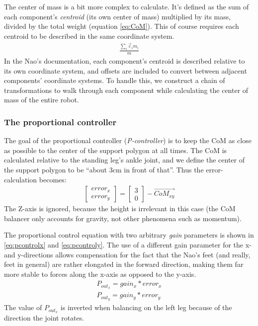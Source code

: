 \documentclass[a4paper]{article}
\begin{document}
The center of mass is a bit more complex to calculate. It's defined as the sum
of each component’s \emph{centroid} (its own center of mass) multiplied by its
mass, divided by the total weight (equation \ref{eq:CoM}). This of course
requires each centroid to be described in the same coordinate system.
\begin{align}
  \frac{\sum_i \vec{c}_i m_i} {m}        \label{eq:CoM}
\end{align}
In the Nao’s documentation, each component's centroid is described relative to
its own coordinate system, and offsets are included to convert between adjacent
components’ coordinate systems. To handle this, we construct a chain of
transformations to walk through each component while calculating the center of
mass of the entire robot.

\subsubsection{The proportional controller}
The goal of the proportional controller (\emph{P-controller}) is to keep the
CoM as close as possible to the center of the support polygon at all times.
The CoM is calculated relative to the standing leg's ankle joint, and we define
the center of the support polygon to be ``about 3cm in front of that''. Thus the
error-calculation becomes:
\begin{align}
  \begin{bmatrix} error_x \\ error_y \end{bmatrix} = \begin{bmatrix} 3 \\ 0 \end{bmatrix} - \vec{CoM_{xy}} 
\end{align}
The Z-axis is ignored, because the height is irrelevant in this case (the CoM
balancer only accounts for gravity, not other phenomena such as momentum).

The proportional control equation with two arbitrary \emph{gain} parameters is
shown in \ref{eq:pcontrolx} and \ref{eq:pcontroly}. The use of a different gain
parameter for the x- and y-directions allows compensation for the fact that the
Nao's feet (and really, feet in general) are rather elongated in the forward
direction, making them far more stable to forces along the x-axis as opposed to
the y-axis.
\begin{align}
  P_{out_{x}} = gain_x * error_x        \label{eq:pcontrolx} \\
  P_{out_{y}} = gain_y * error_y        \label{eq:pcontroly}
\end{align}
The value of $P_{out_{x}}$ is inverted when balancing on the left leg because of
the direction the joint rotates.
\end{document}
